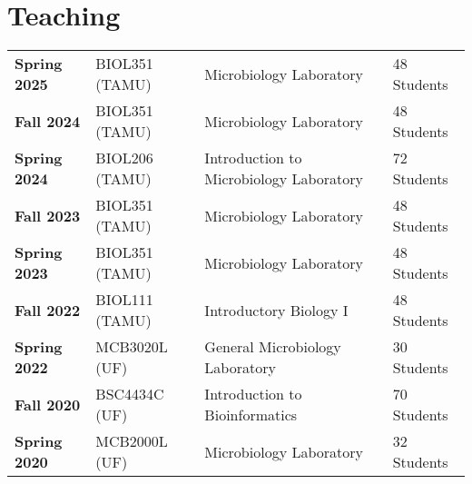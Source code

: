 \documentclass[11pt]{article}
\begin{document}
\section*{Teaching}	
	\begin{longtable}{lp{}p{}p{}}
    		\textbf{Spring 2025} & BIOL351 (TAMU) & Microbiology Laboratory & 48 Students \\
    		\textbf{Fall 2024} & BIOL351 (TAMU) & Microbiology Laboratory & 48 Students \\
   		\textbf{Spring 2024} & BIOL206 (TAMU) & Introduction to Microbiology Laboratory & 72 Students \\
    		\textbf{Fall 2023} & BIOL351 (TAMU) & Microbiology Laboratory & 48 Students \\
    		\textbf{Spring 2023} & BIOL351 (TAMU) & Microbiology Laboratory & 48 Students \\
    		\textbf{Fall 2022} & BIOL111 (TAMU) & Introductory Biology I & 48 Students \\
    		\textbf{Spring 2022} & MCB3020L (UF) & General Microbiology Laboratory & 30 Students \\
    		\textbf{Fall 2020} & BSC4434C (UF) & Introduction to Bioinformatics & 70 Students \\
    		\textbf{Spring 2020} & MCB2000L (UF) & Microbiology Laboratory & 32 Students \\
	\end{longtable}
\end{document}

